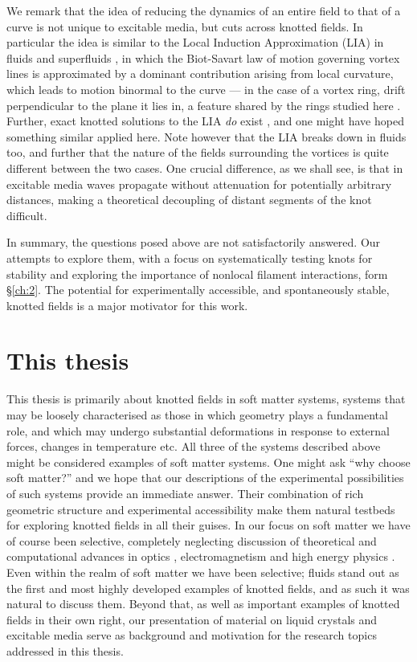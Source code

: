 We remark that the idea of reducing the dynamics of an entire field to that of a curve is not unique to excitable media, but cuts across knotted fields. In particular the idea is similar to the Local Induction Approximation (LIA) in fluids and superfluids \citep{Saffman1992}, in which the Biot-Savart law of motion governing vortex lines is approximated by a dominant contribution arising from local curvature, which leads to motion binormal to the curve --- in the case of a vortex ring, drift perpendicular to the plane it lies in, a feature shared by the rings studied here \citep{Winfree1990}. Further, exact knotted solutions to the LIA \emph{do} exist \citep{Hasimoto1972,Kida1981}, and one might have hoped something similar applied here. Note however that the LIA breaks down in fluids too, and further that the nature of the fields surrounding the vortices is quite different between the two cases. One crucial difference, as we shall see, is that in excitable media waves propagate without attenuation for potentially arbitrary distances, making a theoretical decoupling of distant segments of the knot difficult. 

In summary, the questions posed above are not satisfactorily answered. Our attempts to explore them, with a focus on systematically testing knots for stability and exploring the importance of nonlocal filament interactions, form \S \ref{ch:2}. The potential for experimentally accessible, and spontaneously stable, knotted fields is a major motivator for this work.

\section{This thesis}

This thesis is primarily about knotted fields in soft matter systems, systems that may be loosely characterised as those in which geometry plays a fundamental role, and which may undergo substantial deformations in response to external forces, changes in temperature etc. All three of the systems described above might be considered examples of soft matter systems. One might ask ``why choose soft matter?'' and we hope that our descriptions of the experimental possibilities of such systems provide an immediate answer. Their combination of rich geometric structure and experimental accessibility make them natural testbeds for exploring knotted fields in all their guises. In our focus on soft matter we have of course been selective, completely neglecting discussion of theoretical and computational advances in optics \citep{Bode2016,Dennis2017}, electromagnetism \citep{Ranada1989, Ranada1990, Ranada1992,Irvine2010,Kedia2013,Kedia2016,Arrayas2017,Kedia2018} and high energy physics \citep{Faddeev1997, Houghton1998,Battye1998,Battye1999, Sutcliffe2007}. Even within the realm of soft matter we have been selective; fluids stand out as the first and most highly developed examples of knotted fields, and as such it was natural to discuss them. Beyond that, as well as important examples of knotted fields in their own right, our presentation of material on liquid crystals and excitable media serve as background and motivation for the research topics addressed in this thesis.

